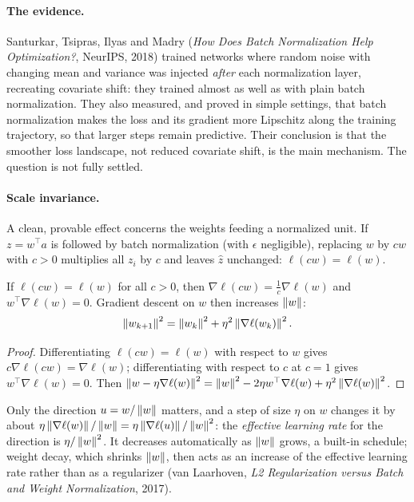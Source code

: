 \begin{notechapter}
\paragraph{The evidence.} Santurkar, Tsipras, Ilyas and Madry (\emph{How Does Batch
Normalization Help Optimization?}, NeurIPS, 2018) trained networks where random noise with
changing mean and variance was injected \emph{after} each normalization layer, recreating
covariate shift: they trained almost as well as with plain batch normalization. They also
measured, and proved in simple settings, that batch normalization makes the loss and its
gradient more Lipschitz along the training trajectory, so that larger steps remain
predictive. Their conclusion is that the smoother loss landscape, not reduced covariate
shift, is the main mechanism. The question is not fully settled.

\paragraph{Scale invariance.} A clean, provable effect concerns the weights feeding a
normalized unit. If $z = w^\top a$ is followed by batch normalization (with $\epsilon$ negligible), replacing $w$ by
$cw$ with $c>0$ multiplies all $z_i$ by $c$ and leaves $\hat z$ unchanged: $\ell(cw) = \ell(w)$.

\begin{proposition}\label{normalization:prop:scale}
If $\ell(cw) = \ell(w)$ for all $c>0$, then $\nabla\ell(cw) = \frac1c\nabla\ell(w)$ and $w^\top\nabla\ell(w) = 0$. Gradient descent on $w$ then
increases $\left\|w\right\|$:
\[
  \left\|w_{k+1}\right\|^2 = \left\|w_k\right\|^2 + \eta^2\left\|\nabla\ell(w_k)\right\|^2 .
\]
\end{proposition}

\begin{proof}
Differentiating $\ell(cw) = \ell(w)$ with respect to $w$ gives $c\nabla\ell(cw) = \nabla\ell(w)$; differentiating with respect to $c$ at
$c = 1$ gives $w^\top\nabla\ell(w) = 0$. Then $\left\|w - \eta\nabla\ell(w)\right\|^2 = \left\|w\right\|^2 - 2\eta w^\top\nabla\ell(w) + \eta^2\left\|\nabla\ell(w)\right\|^2$.
\end{proof}

Only the direction $u = w/\left\|w\right\|$ matters, and a step of size $\eta$ on $w$ changes it by about
$\eta\left\|\nabla\ell(w)\right\|/\left\|w\right\| = \eta\left\|\nabla\ell(u)\right\|/\left\|w\right\|^2$: the \emph{effective learning rate} for the direction is $\eta/\left\|w\right\|^2$. It
decreases automatically as $\left\|w\right\|$ grows, a built-in schedule; weight decay, which shrinks $\left\|w\right\|$,
then acts as an increase of the effective learning rate rather than as a regularizer (van
Laarhoven, \emph{L2 Regularization versus Batch and Weight Normalization}, 2017).


\end{notechapter}
